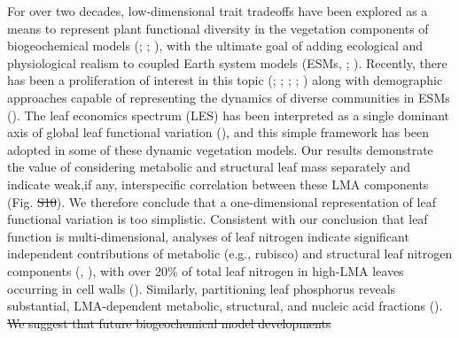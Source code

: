 \documentclass[
  12pt,
  letterpaper,
  DIV=11,
  numbers=noendperiod]{scrartcl}
\providecommand{\DIFadd}[1]{{\protect\color{blue}\uwave{#1}}} %
\providecommand{\DIFdel}[1]{{\protect\color{red}\sout{#1}}}                      %
\providecommand{\DIFaddbegin}{} %
\providecommand{\DIFaddend}{} %
\providecommand{\DIFdelbegin}{} %
\providecommand{\DIFdelend}{} %
\newcommand{\DIFscaledelfig}{0.5}
\newlength{\DIFdelgraphicswidth} %
\newlength{\DIFdelgraphicsheight} %
\newcommand{\DIFaddincludegraphics}[2][]{{\color{blue}\fbox{\DIFOincludegraphics[#1]{#2}}}} %
\newcommand{\DIFdelincludegraphics}[2][]{%
\sbox{\DIFdelgraphicsbox}{\DIFOincludegraphics[#1]{#2}}%
\settoboxwidth{\DIFdelgraphicswidth}{\DIFdelgraphicsbox} %
\settoboxtotalheight{\DIFdelgraphicsheight}{\DIFdelgraphicsbox} %
\scalebox{\DIFscaledelfig}{%
\parbox[b]{\DIFdelgraphicswidth}{\usebox{\DIFdelgraphicsbox}\\[-\baselineskip] \rule{\DIFdelgraphicswidth}{0em}}\llap{\resizebox{\DIFdelgraphicswidth}{\DIFdelgraphicsheight}{%
\setlength{\unitlength}{\DIFdelgraphicswidth}%
\begin{picture}(1,1)%
\thicklines\linethickness{2pt} %
{\color[rgb]{1,0,0}\put(0,0){\framebox(1,1){}}}%
{\color[rgb]{1,0,0}\put(0,0){\line( 1,1){1}}}%
{\color[rgb]{1,0,0}\put(0,1){\line(1,-1){1}}}%
\end{picture}%
}\hspace*{3pt}}} %
} %
\DeclareRobustCommand{\DIFaddbegin}{\DIFOaddbegin \let\includegraphics\DIFaddincludegraphics} %
\DeclareRobustCommand{\DIFaddend}{\DIFOaddend \let\includegraphics\DIFOincludegraphics} %
\DeclareRobustCommand{\DIFdelbegin}{\DIFOdelbegin \let\includegraphics\DIFdelincludegraphics} %
\DeclareRobustCommand{\DIFdelend}{\DIFOaddend \let\includegraphics\DIFOincludegraphics} %
\begin{document}
For over two decades, low-dimensional trait tradeoffs have been explored
as a means to represent plant functional diversity in the vegetation
components of biogeochemical models
(;
;
), with the ultimate
goal of adding ecological and physiological realism to coupled Earth
system models (ESMs, ;
). Recently,
there has been a proliferation of interest in this topic
(;
;
;
;
) along
with demographic approaches capable of representing the dynamics of
diverse communities in ESMs (). The leaf economics spectrum (LES) has been interpreted as a
single dominant axis of global leaf functional variation
(), and this simple
framework has been adopted in some of these dynamic vegetation models.
Our results demonstrate the value of considering metabolic and
structural leaf mass separately and indicate weak,if any, interspecific
correlation between these LMA components (Fig. \DIFdelbegin \DIFdel{S10}\DIFdelend \DIFaddbegin \DIFadd{S1}\DIFaddend ). We therefore
conclude that a one-dimensional representation of leaf functional
variation is too simplistic. Consistent with our conclusion that leaf
function is multi-dimensional, analyses of leaf nitrogen indicate
significant independent contributions of metabolic (e.g., rubisco) and
structural leaf nitrogen components (, ), with over 20\% of total leaf
nitrogen in high-LMA leaves occurring in cell walls
(). Similarly, partitioning
leaf phosphorus reveals substantial, LMA-dependent metabolic,
structural, and nucleic acid fractions
().
\DIFdelbegin \DIFdel{We suggest that
future biogeochemical model developments }\DIFdelend \DIFaddbegin 
\end{document}
